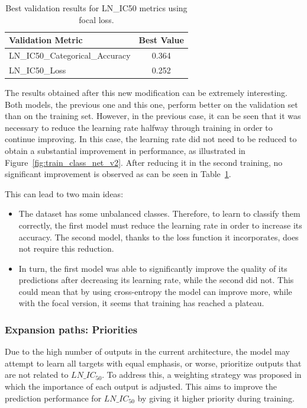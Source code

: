 \begin{table}[H]
    \centering
    \begin{tabular}{|l|c|}
    \hline
    \textbf{Validation Metric} & \textbf{Best Value} \\
    \hline
    LN\_IC50\_Categorical\_Accuracy & 0.364 \\
    LN\_IC50\_Loss & 0.252 \\
    \hline
    \end{tabular}
    \caption{Best validation results for LN\_IC50 metrics using focal loss.}
    \label{tab:best_val_ln_ic50_focal}
\end{table}

The results obtained after this new modification can be extremely interesting. Both models, the previous one and this one, perform better on the validation set than on the training set. However, in the previous case, it can be seen that it was necessary to reduce the learning rate halfway through training in order to continue improving. In this case, the learning rate did not need to be reduced to obtain a substantial improvement in performance, as illustrated in Figure~\ref{fig:train_class_net_v2}. After reducing it in the second training, no significant improvement is observed as can be seen in Table~\ref{tab:best_val_ln_ic50_focal}. 

This can lead to two main ideas:

\begin{itemize}
    \item The dataset has some unbalanced classes. Therefore, to learn to classify them correctly, the first model must reduce the learning rate in order to increase its accuracy. The second model, thanks to the loss function it incorporates, does not require this reduction.
    \item In turn, the first model was able to significantly improve the quality of its predictions after decreasing its learning rate, while the second did not. This could mean that by using cross-entropy the model can improve more, while with the focal version, it seems that training has reached a plateau.
\end{itemize}

\subsubsection{Expansion paths: Priorities}

Due to the high number of outputs in the current architecture, the model may attempt to learn all targets with equal emphasis, or worse, prioritize outputs that are not related to \(LN\_IC_{50}\). To address this, a weighting strategy was proposed in which the importance of each output is adjusted. This aims to improve the prediction performance for \(LN\_IC_{50}\) by giving it higher priority during training.

